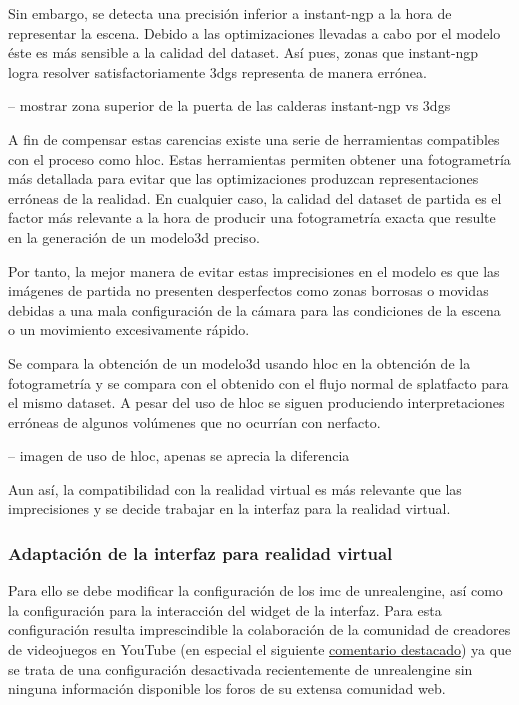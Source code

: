 \documentclass[a4paper, 12pt, spanish, twoside]{article}
\begin{document}
Sin embargo, se detecta una precisión inferior a \gls{instant-ngp} a la hora de representar la escena. Debido a las optimizaciones llevadas a cabo por el modelo éste es más sensible a la calidad del \gls{dataset}. Así pues, zonas que \gls{instant-ngp} logra resolver satisfactoriamente \acrshort{3dgs} representa de manera errónea. 

-- mostrar zona superior de la puerta de las calderas instant-ngp vs 3dgs 

A fin de compensar estas carencias existe una serie de herramientas compatibles con el proceso como \acrshort{hloc}. Estas herramientas permiten obtener una fotogrametría más detallada para evitar que las optimizaciones produzcan representaciones erróneas de la realidad. En cualquier caso, la calidad del \gls{dataset} de partida es el factor más relevante a la hora de producir una fotogrametría exacta que resulte en la generación de un \gls{modelo3d} preciso.  

Por tanto, la mejor manera de evitar estas imprecisiones en el modelo es que las imágenes de partida no presenten desperfectos como zonas borrosas o movidas debidas a una mala configuración de la cámara para las condiciones de la escena o un movimiento excesivamente rápido. 

Se compara la obtención de un \gls{modelo3d} usando \acrshort{hloc} en la obtención de la fotogrametría y se compara con el obtenido con el flujo normal de \gls{splatfacto} para el mismo \gls{dataset}. A pesar del uso de \acrshort{hloc} se siguen produciendo interpretaciones erróneas de algunos volúmenes que no ocurrían con \gls{nerfacto}.  

-- imagen de uso de hloc, apenas se aprecia la diferencia 

Aun así, la compatibilidad con la realidad virtual es más relevante que las imprecisiones y se decide trabajar en la interfaz para la realidad virtual. 

\subsubsection{Adaptación de la interfaz para realidad virtual} \label{sec:implementacion:3dgs-volinga:adaptacion}

Para ello se debe modificar la configuración de los \acrfull{imc} de \gls{unrealengine}, así como la configuración para la interacción del \gls{widget} de la interfaz. Para esta configuración resulta imprescindible la colaboración de la comunidad de creadores de videojuegos en YouTube (en especial el siguiente \href{https://www.youtube.com/watch?v=kM27HYbpvc0&lc=Ugw7MlymoPWPie05Jx54AaABAg}{comentario destacado}) ya que se trata de una configuración desactivada recientemente de \gls{unrealengine} sin ninguna información disponible los foros de su extensa comunidad web. 
\end{document}
